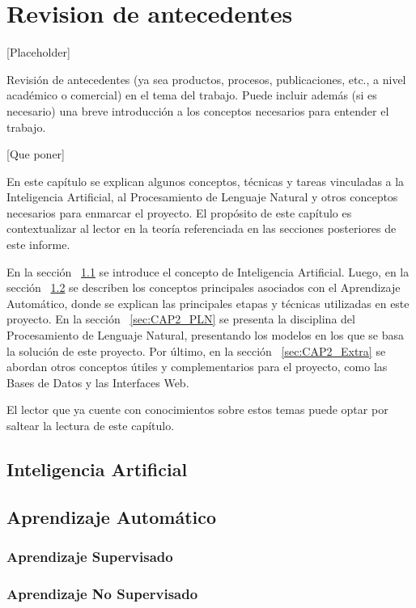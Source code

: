 \chapter{Revision de antecedentes}

[Placeholder]

Revisión de antecedentes (ya sea productos, procesos, publicaciones, etc., a nivel académico o comercial) en el tema del trabajo. Puede incluir además (si es necesario) una breve introducción a los conceptos necesarios para entender el trabajo.

[Que poner]

En este capítulo se explican algunos conceptos, técnicas y tareas vinculadas a la Inteligencia Artificial, al Procesamiento de Lenguaje Natural y otros conceptos necesarios para enmarcar el proyecto. El propósito de este capítulo es contextualizar al lector en la teoría referenciada en las secciones posteriores de este informe.

En la sección ~\ref{sec:CAP2_IA} se introduce el concepto de Inteligencia Artificial. Luego, en la sección ~\ref{sec:CAP2_AA} se describen los conceptos principales asociados con el Aprendizaje Automático, donde se explican las principales etapas y técnicas utilizadas en este proyecto. En la sección ~\ref{sec:CAP2_PLN} se presenta la disciplina del Procesamiento de Lenguaje Natural, presentando los modelos en los que se basa la solución de este proyecto. Por último, en la sección ~\ref{sec:CAP2_Extra} se abordan otros conceptos útiles y complementarios para el proyecto, como las Bases de Datos y las Interfaces Web.

El lector que ya cuente con conocimientos sobre estos temas puede optar por saltear la lectura de este capítulo.

\section{Inteligencia Artificial}\label{sec:CAP2_IA}

\section{Aprendizaje Automático}\label{sec:CAP2_AA}

\subsection{Aprendizaje Supervisado}

\subsection{Aprendizaje No Supervisado}

